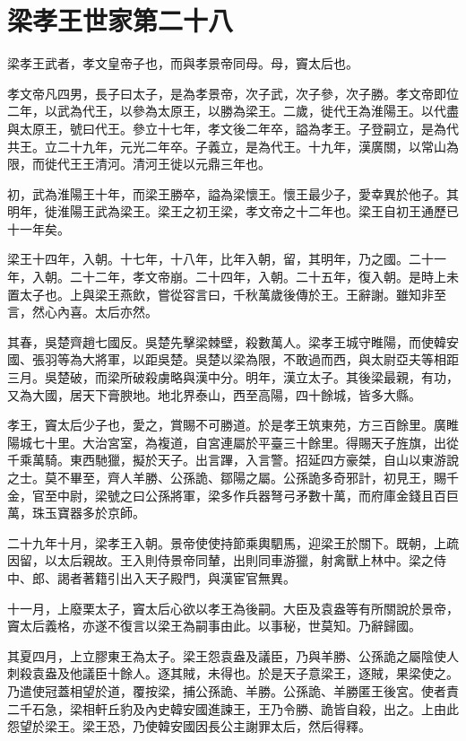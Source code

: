 \chapter{梁孝王世家第二十八}

梁孝王武者，孝文皇帝子也，而與孝景帝同母。母，竇太后也。

孝文帝凡四男，長子曰太子，是為孝景帝，次子武，次子參，次子勝。孝文帝即位二年，以武為代王，以參為太原王，以勝為梁王。二歲，徙代王為淮陽王。以代盡與太原王，號曰代王。參立十七年，孝文後二年卒，謚為孝王。子登嗣立，是為代共王。立二十九年，元光二年卒。子義立，是為代王。十九年，漢廣關，以常山為限，而徙代王王清河。清河王徙以元鼎三年也。

初，武為淮陽王十年，而梁王勝卒，謚為梁懷王。懷王最少子，愛幸異於他子。其明年，徙淮陽王武為梁王。梁王之初王梁，孝文帝之十二年也。梁王自初王通歷已十一年矣。

梁王十四年，入朝。十七年，十八年，比年入朝，留，其明年，乃之國。二十一年，入朝。二十二年，孝文帝崩。二十四年，入朝。二十五年，復入朝。是時上未置太子也。上與梁王燕飲，嘗從容言曰，千秋萬歲後傳於王。王辭謝。雖知非至言，然心內喜。太后亦然。

其春，吳楚齊趙七國反。吳楚先擊梁棘壁，殺數萬人。梁孝王城守睢陽，而使韓安國、張羽等為大將軍，以距吳楚。吳楚以梁為限，不敢過而西，與太尉亞夫等相距三月。吳楚破，而梁所破殺虜略與漢中分。明年，漢立太子。其後梁最親，有功，又為大國，居天下膏腴地。地北界泰山，西至高陽，四十餘城，皆多大縣。

孝王，竇太后少子也，愛之，賞賜不可勝道。於是孝王筑東苑，方三百餘里。廣睢陽城七十里。大治宮室，為複道，自宮連屬於平臺三十餘里。得賜天子旌旗，出從千乘萬騎。東西馳獵，擬於天子。出言蹕，入言警。招延四方豪桀，自山以東游說之士。莫不畢至，齊人羊勝、公孫詭、鄒陽之屬。公孫詭多奇邪計，初見王，賜千金，官至中尉，梁號之曰公孫將軍，梁多作兵器弩弓矛數十萬，而府庫金錢且百巨萬，珠玉寶器多於京師。

二十九年十月，梁孝王入朝。景帝使使持節乘輿駟馬，迎梁王於關下。既朝，上疏因留，以太后親故。王入則侍景帝同輦，出則同車游獵，射禽獸上林中。梁之侍中、郎、謁者著籍引出入天子殿門，與漢宦官無異。

十一月，上廢栗太子，竇太后心欲以孝王為後嗣。大臣及袁盎等有所關說於景帝，竇太后義格，亦遂不復言以梁王為嗣事由此。以事秘，世莫知。乃辭歸國。

其夏四月，上立膠東王為太子。梁王怨袁盎及議臣，乃與羊勝、公孫詭之屬陰使人刺殺袁盎及他議臣十餘人。逐其賊，未得也。於是天子意梁王，逐賊，果梁使之。乃遣使冠蓋相望於道，覆按梁，捕公孫詭、羊勝。公孫詭、羊勝匿王後宮。使者責二千石急，梁相軒丘豹及內史韓安國進諫王，王乃令勝、詭皆自殺，出之。上由此怨望於梁王。梁王恐，乃使韓安國因長公主謝罪太后，然后得釋。


